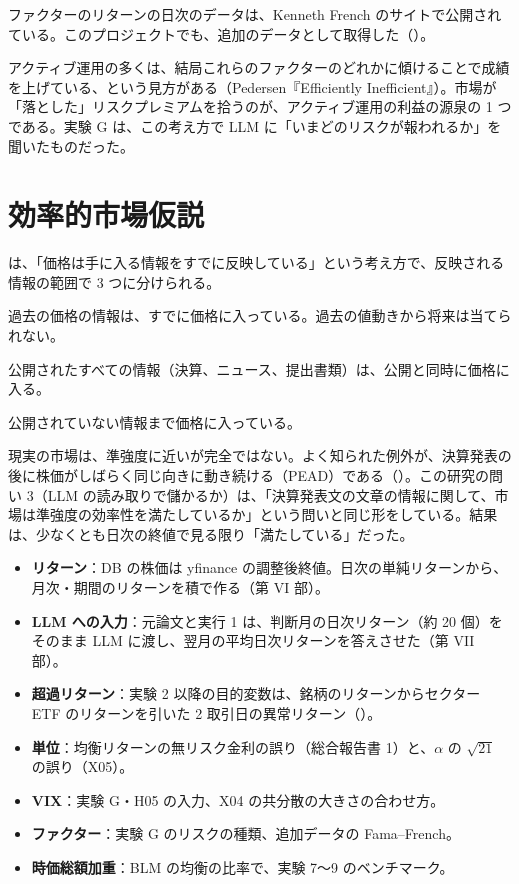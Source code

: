 ファクターのリターンの日次のデータは、Kenneth French のサイトで公開されている。このプロジェクトでも、追加のデータとして取得した（）。

アクティブ運用の多くは、結局これらのファクターのどれかに傾けることで成績を上げている、という見方がある（Pedersen『Efficiently Inefficient』）。市場が「落とした」リスクプレミアムを拾うのが、アクティブ運用の利益の源泉の 1 つである。実験 G は、この考え方で LLM に「いまどのリスクが報われるか」を聞いたものだった。

\section{効率的市場仮説}

は、「価格は手に入る情報をすでに反映している」という考え方で、反映される情報の範囲で 3 つに分けられる。

\begin{description}[leftmargin=1.5em,style=nextline]
\item[弱度] 過去の価格の情報は、すでに価格に入っている。過去の値動きから将来は当てられない。
\item[準強度] 公開されたすべての情報（決算、ニュース、提出書類）は、公開と同時に価格に入る。
\item[強度] 公開されていない情報まで価格に入っている。
\end{description}

現実の市場は、準強度に近いが完全ではない。よく知られた例外が、決算発表の後に株価がしばらく同じ向きに動き続ける（PEAD）である（）。この研究の問い 3（LLM の読み取りで儲かるか）は、「決算発表文の文章の情報に関して、市場は準強度の効率性を満たしているか」という問いと同じ形をしている。結果は、少なくとも日次の終値で見る限り「満たしている」だった。

\begin{projbox}
\begin{itemize}
\item \textbf{リターン}：DB の株価は yfinance の調整後終値。日次の単純リターンから、月次・期間のリターンを積で作る（第 VI 部）。
\item \textbf{LLM への入力}：元論文と実行 1 は、判断月の日次リターン（約 20 個）をそのまま LLM に渡し、翌月の平均日次リターンを答えさせた（第 VII 部）。
\item \textbf{超過リターン}：実験 2 以降の目的変数は、銘柄のリターンからセクター ETF のリターンを引いた 2 取引日の異常リターン（）。
\item \textbf{単位}：均衡リターンの無リスク金利の誤り（総合報告書 1）と、$\alpha$ の $\sqrt{21}$ の誤り（X05）。
\item \textbf{VIX}：実験 G・H05 の入力、X04 の共分散の大きさの合わせ方。
\item \textbf{ファクター}：実験 G のリスクの種類、追加データの Fama--French。
\item \textbf{時価総額加重}：BLM の均衡の比率で、実験 7〜9 のベンチマーク。
\end{itemize}
\end{projbox}
